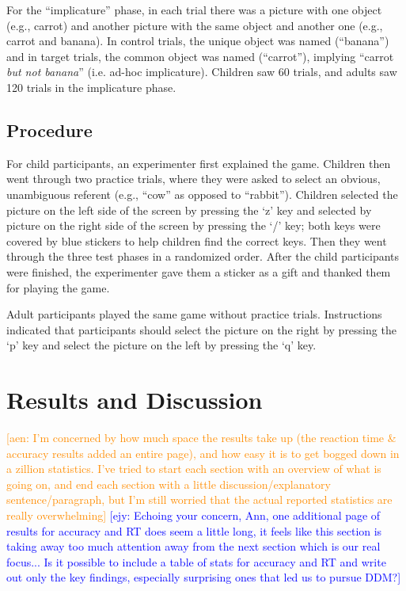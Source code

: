 \documentclass[10pt,letterpaper]{article}
\newcommand{\ejy}[1]{\textcolor{Blue}{[ejy: #1]}}
\newcommand{\aen}[1]{\textcolor{DarkOrange}{[aen: #1]}}
\begin{document}
For the ``implicature'' phase, in each trial there was a picture with one object (e.g., carrot) and another picture with the same object and another one (e.g., carrot and banana). In control trials, the unique object was named (``banana'') and in target trials, the common object was named (``carrot''), implying ``carrot \emph{but not banana}'' (i.e. ad-hoc implicature). Children saw 60 trials, and adults saw 120 trials in the implicature phase.  

\subsection{Procedure}

For child participants, an experimenter first explained the game.  Children then went through two practice trials, where they were asked to select an obvious, unambiguous referent (e.g., ``cow'' as opposed to ``rabbit'').  Children selected the picture on the left side of the screen by pressing the `z' key and selected by picture on the right side of the screen by pressing the `/' key; both keys were covered by blue stickers to help children find the correct keys. Then they went through the three test phases in a randomized order.  After the child participants were finished, the experimenter gave them a sticker as a gift and thanked them for playing the game.

Adult participants played the same game without practice trials.  Instructions indicated that participants should select the picture on the right by pressing the `p' key and select the picture on the left by pressing the `q' key.  

\section{Results and Discussion}

\aen{I'm concerned by how much space the results take up (the reaction time \& accuracy results added an entire page), and how easy it is to get bogged down in a zillion statistics.  I've tried to start each section with an overview of what is going on, and end each section with a little discussion/explanatory sentence/paragraph, but I'm still worried that the actual reported statistics are really overwhelming}
\ejy{Echoing your concern, Ann, one additional page of results for accuracy and RT does seem a little long, it feels like this section is taking away too much attention away from the next section which is our real focus... Is it possible to include a table of stats for accuracy and RT and write out only the key findings, especially surprising ones that led us to pursue DDM?}
\end{document}
